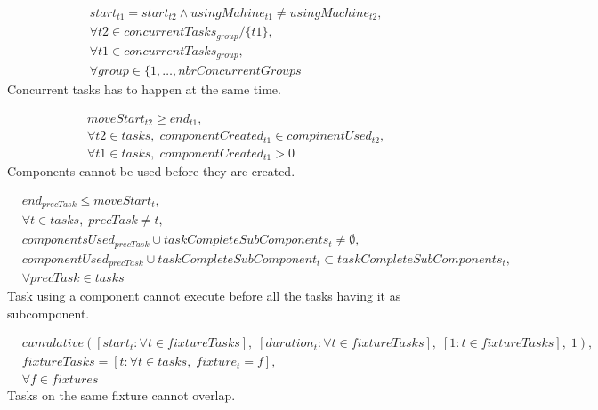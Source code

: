 \documentclass[10pt,a4paper]{report}
\begin{document}
\begin{equation}
\begin{aligned}\label{eq:101}
&start_{t1} = start_{t2} \land usingMahine_{t1} \neq usingMachine_{t2}, \\
&\forall t2 \in concurrentTasks_{group} / \{t1\}, \\
&\forall t1 \in concurrentTasks_{group}, \\
&\forall group \in \{1 , \ldots , nbrConcurrentGroups
\end{aligned}
\end{equation}
Concurrent tasks has to happen at the same time.

\begin{equation}
\begin{aligned}\label{eq:102}
&moveStart_{t2} \geq end_{t1}, \\
&\forall t2 \in tasks, \; componentCreated_{t1} \in compinentUsed_{t2}, \\
&\forall t1 \in tasks, \; componentCreated_{t1} > 0
\end{aligned}
\end{equation}
Components cannot be used before they are created.

\begin{equation}
\begin{aligned}\label{eq:103}
&end_{precTask} \leq moveStart_t, \\
&\forall t \in tasks, \; precTask \neq t, \\
&componentsUsed_{precTask} \cup taskCompleteSubComponents_t \neq \emptyset, \\
&componentUsed_{precTask} \cup taskCompleteSubComponent_t \subset taskCompleteSubComponents_t, \\
&\forall precTask \in tasks
\end{aligned}
\end{equation}
Task using a component cannot execute before all the tasks having it as subcomponent.

\begin{equation}
\begin{aligned}\label{eq:104}
&cumulative([start_{t} : \forall t \in fixtureTasks], \; [duration_t : \forall t \in fixtureTasks], \; [1 : t \in fixtureTasks], \; 1), \\
&fixtureTasks = [t : \forall t \in tasks, \; fixture_t = f], \\
&\forall f \in fixtures
\end{aligned}
\end{equation}
Tasks on the same fixture cannot overlap.
\end{document}
